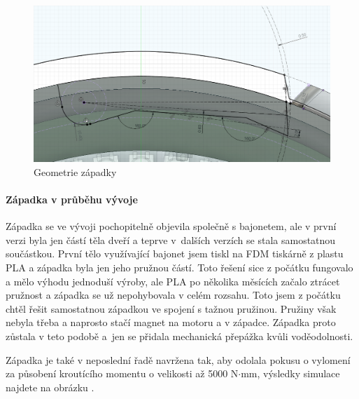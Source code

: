 \begin{figure}[htbp]
    \centering
    \includegraphics[width=\textwidth]{kapitoly/obrazky/E4/zapadka/uhel_cela.png}
    \caption{Geometrie západky}
    \label{fig:E4-uhel_cela_zapadky}
\end{figure}


\paragraph{Západka v průběhu vývoje}

Západka se ve vývoji pochopitelně objevila společně s bajonetem, ale v první verzi byla jen částí těla dveří a teprve v~dalších verzích se stala
samostatnou součástkou. První tělo využívající bajonet jsem tiskl na FDM tiskárně z plastu PLA a západka byla jen jeho pružnou částí. Toto řešení sice 
z počátku fungovalo a mělo výhodu jednoduší výroby, ale PLA po několika měsících začalo ztrácet pružnost a západka se už nepohybovala v celém rozsahu.
Toto jsem z počátku chtěl řešit samostatnou západkou ve spojení s tažnou pružinou. Pružiny však nebyla třeba a naprosto stačí magnet na motoru a v západce.
Západka proto zůstala v teto podobě a~jen se přidala mechanická přepážka kvůli voděodolnosti. 

Západka je také v neposlední řadě navržena tak, aby odolala pokusu o vylomení za působení kroutícího momentu o velikosti až 5000 N$\cdot$mm, výsledky simulace najdete 
na obrázku .
